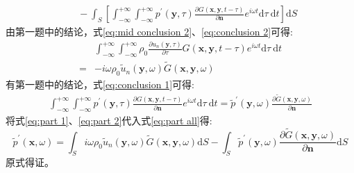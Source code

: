 \begin{enumerate}
\begin{equation}
\begin{aligned}
                &{~~~}- \int_{S} \left[ \int_{-\infty}^{+\infty} \int_{-\infty}^{+\infty} p^{\prime}(\boldsymbol{y}, \tau) \frac{\partial G(\boldsymbol{x}, \boldsymbol{y}, t-\tau)}{\partial \boldsymbol{n}} e^{i \omega t} \mathrm{d} \tau \mathrm{~d} t \right] \mathrm{d} S 
            \end{aligned}
        \end{equation}
        由第一题中的结论，式\eqref{eq:mid conclusion 2}、\eqref{eq:conclusion 2}可得:
        \begin{equation}
            \label{eq:part 1}
            \begin{aligned}
                & \int_{-\infty}^{+\infty} \int_{-\infty}^{+\infty} \rho_{0} \frac{\partial u_{n}(\boldsymbol{y}, \tau)}{\partial \tau} G(\boldsymbol{x}, \boldsymbol{y}, t-\tau) e^{i \omega t} \mathrm{d} \tau \mathrm{~d} t \\
                =& - i \omega \rho_{0} \tilde{u}_{n}(\boldsymbol{y}, \omega) \tilde{G}(\boldsymbol{x}, \boldsymbol{y}, \omega)
            \end{aligned}
        \end{equation}
        有第一题中的结论，式\eqref{eq:conclusion 1}可得:
        \begin{equation}
            \label{eq:part 2}
            \begin{aligned}
                \int_{-\infty}^{+\infty} \int_{-\infty}^{+\infty} p^{\prime}(\boldsymbol{y}, \tau) \frac{\partial G(\boldsymbol{x}, \boldsymbol{y}, t-\tau)}{\partial \boldsymbol{n}} e^{i \omega t} \mathrm{d} \tau \mathrm{~d} t 
                = \tilde{p}^{\prime}(\boldsymbol{y}, \omega) \frac{\partial \tilde{G}(\boldsymbol{x}, \boldsymbol{y}, \omega)}{\partial \boldsymbol{n}}
            \end{aligned}
        \end{equation}
        将式\eqref{eq:part 1}、\eqref{eq:part 2}代入式\eqref{eq:part all}得:
        \begin{equation}
            \tilde{p}^{\prime}(\boldsymbol{x}, \omega)=\int_{S} i \omega \rho_{0} \tilde{u}_{n}(\boldsymbol{y}, \omega) \tilde{G}(\boldsymbol{x}, \boldsymbol{y}, \omega) \mathrm{d} S-\int_{S} \tilde{p}^{\prime}(\boldsymbol{y}, \omega) \frac{\partial \tilde{G}(\boldsymbol{x}, \boldsymbol{y}, \omega)}{\partial \boldsymbol{n}} \mathrm{d} S
        \end{equation}
        原式得证。

\end{enumerate}

\clearpage